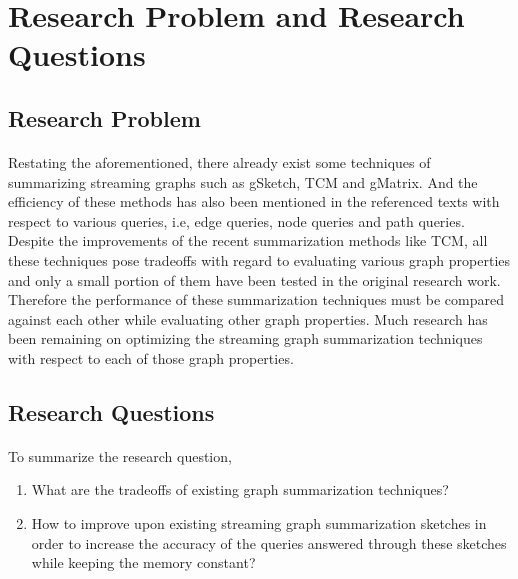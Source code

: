 \section{Research Problem and Research Questions}

\subsection{Research Problem}

\paragraph{}
Restating the aforementioned, there already exist some techniques of summarizing streaming graphs such as gSketch\cite{zhao_gsketch:_2011}, TCM\cite{tang_graph_2016} and gMatrix\cite{khan_query-friendly_2016}. And the efficiency of these methods has also been mentioned in the referenced texts with respect to various queries, i.e, edge queries, node queries and path queries. Despite the improvements of the recent summarization methods like TCM, all these techniques pose tradeoffs with regard to evaluating various graph properties and only a small portion of them have been tested in the original research work. Therefore the performance of these summarization techniques must be compared against each other while evaluating other graph properties. Much research has been remaining on optimizing the streaming graph summarization techniques with respect to each of those graph properties.

\subsection{Research Questions}
\label{section:research_questions}

\paragraph{}
To summarize the research question,

\begin{enumerate}
    \item What are the tradeoffs of existing graph summarization techniques?
    \item How to improve upon existing streaming graph summarization sketches in order to increase the accuracy of the queries answered through these sketches while keeping the memory constant?
\end{enumerate}